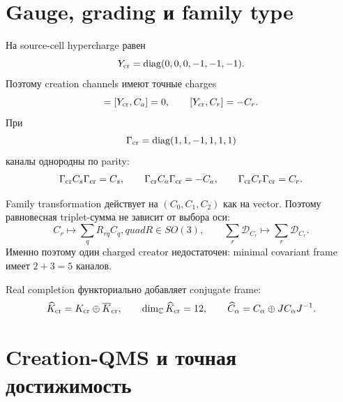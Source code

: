 \section{Gauge, grading и family type}

На source-cell hypercharge равен
\begin{equation}
 Y_{\rm cr}=\operatorname{diag}(0,0,0,-1,-1,-1).
 \label{eq:v9-creation-hypercharge}
\end{equation}
Поэтому creation channels имеют точные charges
\begin{equation}
 [Y_{\rm cr},C_s]=[Y_{\rm cr},C_a]=0,
 \qquad [Y_{\rm cr},C_r]=-C_r.
 \label{eq:v9-creation-charge-types}
\end{equation}
При
\begin{equation}
 \Gamma_{\rm cr}=\operatorname{diag}(1,1,-1,1,1,1)
 \label{eq:v9-creation-grading}
\end{equation}
каналы однородны по parity:
\begin{equation}
 \Gamma_{\rm cr}C_s\Gamma_{\rm cr}=C_s,
 \qquad \Gamma_{\rm cr}C_a\Gamma_{\rm cr}=-C_a,
 \qquad \Gamma_{\rm cr}C_r\Gamma_{\rm cr}=C_r.
 \label{eq:v9-creation-parities}
\end{equation}

Family transformation действует на $(C_0,C_1,C_2)$ как на vector. Поэтому
равновесная triplet-сумма не зависит от выбора оси:
\begin{equation}
 C_r\longmapsto\sum_q R_{rq}C_q,quad R\in SO(3),
 \qquad \sum_r\mathcal D_{C_r}\longmapsto\sum_r\mathcal D_{C_r}.
 \label{eq:v9-creation-family-covariance}
\end{equation}
Именно поэтому один charged creator недостаточен: minimal covariant frame
имеет $2+3=5$ каналов.

Real completion функториально добавляет conjugate frame:
\begin{equation}
 \widehat K_{\rm cr}=K_{\rm cr}\oplus\overline K_{\rm cr},
 \qquad \dim_{\mathbb C}\widehat K_{\rm cr}=12,
 \qquad \widehat C_\alpha=C_\alpha\oplus JC_\alpha J^{-1}.
 \label{eq:v9-creation-real-double}
\end{equation}

\section{Creation-QMS и точная достижимость}

